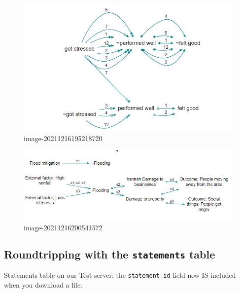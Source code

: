 \documentclass[
]{book}
\begin{document}
\begin{figure}
\centering
\includegraphics[width=6.77083in,height=\textheight]{_assets/image-20211216195218720.png}
\caption{image-20211216195218720}
\end{figure}

\begin{figure}
\centering
\includegraphics[width=6.77083in,height=\textheight]{_assets/image-20211216200541572.png}
\caption{image-20211216200541572}
\end{figure}

\hypertarget{roundtripping-with-the-statements-table}{%
\subsection{\texorpdfstring{Roundtripping with the \texttt{statements} table}{Roundtripping with the statements table}}\label{roundtripping-with-the-statements-table}}

Statements table on our Test server: the \texttt{statement\_id} field now IS included when you download a file.
\end{document}
